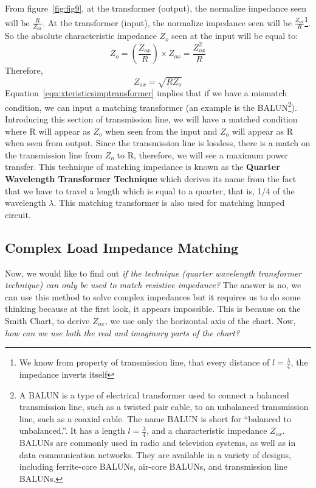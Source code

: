 From figure~\ref{fig:fig9}, at the transformer (output), the normalize impedance seen will be $\frac{R}{Z_{ox}}$. At the transformer (input), the normalize impedance seen will be $\frac{Z_{ox}}{R}$\footnote{
We know from property of transmission line, that every distance of $l = \frac{\lambda}{4}$, the impedance inverts itself
}. So the absolute characteristic impedance $ Z_o$ seen at the input will be equal to: 
\begin{dmath*}
Z_o=\left(\frac{Z_{ox}}{R}\right)\times Z_{ox}
=\frac{Z_{ox}^2}{R}
\end{dmath*}
Therefore,
\begin{equation}
Z_{ox}=\sqrt{RZ_o}
\label{eqn:xteristicsimptransformer}
\end{equation}
Equation~\eqref{eqn:xteristicsimptransformer} implies that if we have a mismatch condition, we can input a matching transformer (an example is the \uppercase{balun}\footnote{
A \uppercase{balun} is a type of electrical transformer used to connect a balanced transmission line, such as a twisted pair cable, to an unbalanced transmission line, such as a coaxial cable. The name \uppercase{balun} is short for \textquotedblleft\;balanced to unbalanced.\textquotedblright\;. It has a length $l=\frac{\lambda}{4}$, and a characteristic impedance $Z_{ox}$. \uppercase{Balun}s are commonly used in radio and television systems, as well as in data communication networks. They are available in a variety of designs, including ferrite-core \uppercase{balun}s, air-core \uppercase{balun}s, and transmission line \uppercase{balun}s.
}). Introducing this section of transmission line, we will have a matched condition where R will appear as $ Z_o$ when seen from the input and $ Z_o$ will appear as R when seen from output. Since the transmission line is lossless, there is a match on the transmission line from $ Z_o$ to R, therefore, we will see a maximum power transfer.
This technique of matching impedance is known as the \textbf{Quarter Wavelength Transformer Technique} which derives its name from the fact that we have to travel a length which is equal to a quarter, that is, 1/4 of the wavelength $\lambda$. This matching transformer is also used for matching lumped circuit.

\subsection{Complex Load Impedance Matching}
Now, we would like to find out \emph{if the technique (quarter wavelength transformer technique) can only be used to match resistive impedance?} The answer is no, we can use this method to solve complex impedances but it requires us to do some thinking because at the first look, it appears impossible. This is because on the Smith Chart, to derive $Z_{ox}$, we use only the horizontal axis of the chart. Now, \emph{how can we use both the real and imaginary parts of the chart?}

